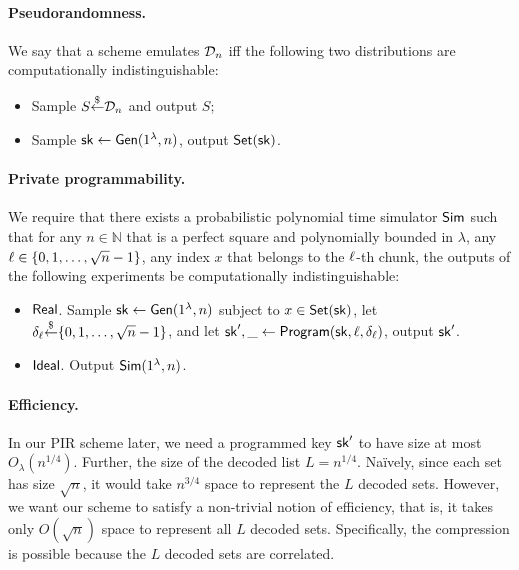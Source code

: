 \paragraph{Pseudorandomness.}
We say that a %
\ppps scheme 
emulates  
$\mathcal{D}_n$ iff 
the following two distributions are computationally indistinguishable:
\begin{itemize}[leftmargin=5mm,itemsep=1pt]
\item 
Sample $S {\overset{\$}{\leftarrow}} \mathcal{D}_n$ and output $S$;
\item 
Sample $\mathsf{sk} \leftarrow {\sf Gen}(1^\lambda, n)$, output  
${\sf Set}(\mathsf{sk})$.
\end{itemize}


\paragraph{Private programmability.}
We require that 
there exists a probabilistic polynomial time simulator ${\sf Sim}$ 
such that 
for any $n \in \mathbb{N}$ that is a perfect square
and polynomially bounded in $\lambda$, 
any $\ell \in \{0, 1, \ldots, \sqrt{n}-1\}$, 
any index $x$ that belongs to the $\ell$-th chunk,  
the outputs of the following experiments be computationally
indistinguishable:
\begin{itemize}[leftmargin=5mm,itemsep=1pt]
\item 
${\sf Real}$.
Sample $\mathsf{sk} \leftarrow {\sf Gen}(1^\lambda, n)$ subject to 
$x \in {\sf Set}(\mathsf{sk})$, 
let $\delta_\ell {\overset{\$}{\leftarrow}} \{0, 1, \ldots, \sqrt{n}-1\}$,  
and let $\mathsf{sk}', \_ \leftarrow {\sf Program}(\mathsf{sk}, \ell, \delta_\ell)$, output $\mathsf{sk}'$.
\item 
${\sf Ideal}$.
Output ${\sf Sim}(1^\lambda, n)$.
\end{itemize}

\paragraph{Efficiency.}
In our PIR scheme later, we need a programmed key $\mathsf{sk}'$ to
have size at most $O_\lambda(n^{1/4})$.
Further, 
the size of the decoded list
$L = n^{1/4}$.
Na\"ively, since each set has size $\sqrt{n}$, it would
take $n^{3/4}$ space to represent
the $L$ decoded sets. 
However, we want our scheme to satisfy a non-trivial notion
of efficiency, that is, 
it takes only $O(\sqrt{n})$
space to represent all $L$ decoded sets. 
Specifically, the compression is possible
because the $L$ decoded sets are correlated.



